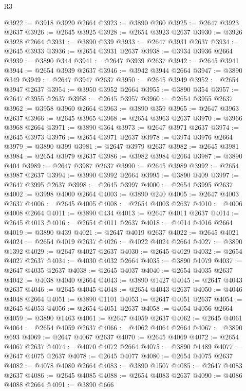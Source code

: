 \begin{lexlean}{R3}
\begin{coremodule}
@3922 := @3918 @3920 @2664
@3923 := @3890 @260
@3925 := @2647 @3923 @2637
@3926 := @2645 @3925
@3928 := @2654 @3923 @2637
@3930 := @3926 @3928 @2664
@3931 := @3890 @339
@3933 := @2647 @3931 @2637
@3934 := @2645 @3933
@3936 := @2654 @3931 @2637
@3938 := @3934 @3936 @2664
@3939 := @3890 @344
@3941 := @2647 @3939 @2637
@3942 := @2645 @3941
@3944 := @2654 @3939 @2637
@3946 := @3942 @3944 @2664
@3947 := @3890 @349
@3949 := @2647 @3947 @2637
@3950 := @2645 @3949
@3952 := @2654 @3947 @2637
@3954 := @3950 @3952 @2664
@3955 := @3890 @354
@3957 := @2647 @3955 @2637
@3958 := @2645 @3957
@3960 := @2654 @3955 @2637
@3962 := @3958 @3960 @2664
@3963 := @3890 @359
@3965 := @2647 @3963 @2637
@3966 := @2645 @3965
@3968 := @2654 @3963 @2637
@3970 := @3966 @3968 @2664
@3971 := @3890 @364
@3973 := @2647 @3971 @2637
@3974 := @2645 @3973
@3976 := @2654 @3971 @2637
@3978 := @3974 @3976 @2664
@3979 := @3890 @399
@3981 := @2647 @3979 @2637
@3982 := @2645 @3981
@3984 := @2654 @3979 @2637
@3986 := @3982 @3984 @2664
@3987 := @3890 @404
@3989 := @2647 @3987 @2637
@3990 := @2645 @3989
@3992 := @2654 @3987 @2637
@3994 := @3990 @3992 @2664
@3995 := @3890 @409
@3997 := @2647 @3995 @2637
@3998 := @2645 @3997
@4000 := @2654 @3995 @2637
@4002 := @3998 @4000 @2664
@4003 := @3890 @240
@4005 := @2647 @4003 @2637
@4006 := @2645 @4005
@4008 := @2654 @4003 @2637
@4010 := @4006 @4008 @2664
@4011 := @3890 @434
@4013 := @2647 @4011 @2637
@4014 := @2645 @4013
@4016 := @2654 @4011 @2637
@4018 := @4014 @4016 @2664
@4019 := @3890 @439
@4021 := @2647 @4019 @2637
@4022 := @2645 @4021
@4024 := @2654 @4019 @2637
@4026 := @4022 @4024 @2664
@4027 := @3890 @1392
@4029 := @2647 @4027 @2637
@4030 := @2645 @4029
@4032 := @2654 @4027 @2637
@4034 := @4030 @4032 @2664
@4035 := @3890 @1079
@4037 := @2647 @4035 @2637
@4038 := @2645 @4037
@4040 := @2654 @4035 @2637
@4042 := @4038 @4040 @2664
@4043 := @3890 @1427
@4045 := @2647 @4043 @2637
@4046 := @2645 @4045
@4048 := @2654 @4043 @2637
@4050 := @4046 @4048 @2664
@4051 := @3890 @1101
@4053 := @2647 @4051 @2637
@4054 := @2645 @4053
@4056 := @2654 @4051 @2637
@4058 := @4054 @4056 @2664
@4059 := @3890 @1463
@4061 := @2647 @4059 @2637
@4062 := @2645 @4061
@4064 := @2654 @4059 @2637
@4066 := @4062 @4064 @2664
@4067 := @3890 @693
@4069 := @2647 @4067 @2637
@4070 := @2645 @4069
@4072 := @2654 @4067 @2637
@4074 := @4070 @4072 @2664
@4075 := @3890 @1489
@4077 := @2647 @4075 @2637
@4078 := @2645 @4077
@4080 := @2654 @4075 @2637
@4082 := @4078 @4080 @2664
@4083 := @3890 @1507
@4085 := @2647 @4083 @2637
@4086 := @2645 @4085
@4088 := @2654 @4083 @2637
@4090 := @4086 @4088 @2664
@4091 := @3890 @666

\end{coremodule}
\end{lexlean}
